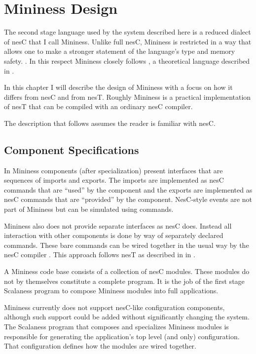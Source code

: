 
\chapter{Mininess Design}
\label{chap:mininess-design}

The second stage language used by the system described here is a reduced dialect of nesC that I
call Mininess. Unlike full nesC, Mininess is restricted in a way that allows one to make a
stronger statement of the language's type and memory safety. . In this respect
Mininess closely follows , a theoretical language described in \cite{XXX}.

In this chapter I will describe the design of Mininess with a focus on how it differs from nesC
and from nesT. Roughly Mininess is a practical implementation of nesT that can be compiled with
an ordinary nesC compiler.

The description that follows assumes the reader is familiar with nesC.

\section{Component Specifications}
\label{sec:component-specifications-design}

In Mininess components (after specialization) present interfaces that are sequences of imports
and exports. The imports are implemented as nesC commands that are ``used'' by the component and
the exports are implemented as nesC commands that are ``provided'' by the component. NesC-style
events are not part of Mininess but can be simulated using commands.


Mininess also does not provide separate interfaces as nesC does. Instead all interaction with
other components is done by way of separately declared commands. These bare commands can be
wired together in the usual way by the nesC compiler \cite{Gay-nesC-2003}. This approach follows
nesT as described in in \cite{FramedML,nesT}.


A Mininess code base consists of a collection of nesC modules. These modules do not by
themselves constitute a complete program. It is the job of the first stage Scalaness program to
compose Mininess modules into full applications.

Mininess currently does not support nesC-like configuration components, although such support
could be added without significantly changing the system. The Scalaness program that composes
and specializes Mininess modules is responsible for generating the application's top level (and
only) configuration. That configuration defines how the modules are wired together.

